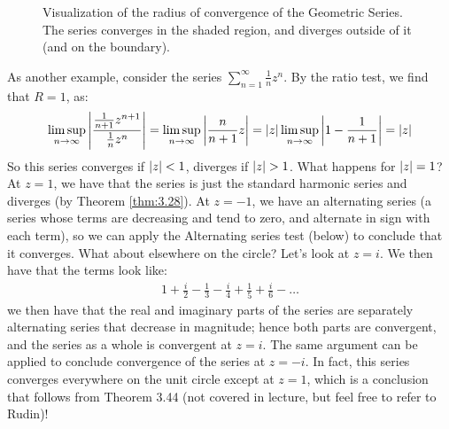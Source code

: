\begin{figure}[htbp]
    \centering
    \caption{Visualization of the radius of convergence of the Geometric Series. The series converges in the shaded region, and diverges outside of it (and on the boundary).}
    \label{fig16}
\end{figure}


As another example, consider the series $\sum_{n=1}^\infty \frac{1}{n}z^n$. By the ratio test, we find that $R = 1$, as:
\begin{align*}
    \limsup_{n\rightarrow \infty} \abs{\frac{\frac{1}{n+1}z^{n+1}}{\frac{1}{n}z^n}} = \limsup_{n\rightarrow \infty}\abs{\frac{n}{n+1}z} = \abs{z} \limsup_{n\rightarrow \infty}\abs{1 - \frac{1}{n+1}} = \abs{z}
\end{align*}
So this series converges if $\abs{z} < 1$, diverges if $\abs{z} > 1$. What happens for $\abs{z} = 1$? At $z = 1$, we have that the series is just the standard harmonic series and diverges (by Theorem \ref{thm:3.28}). At $z = -1$, we have an alternating series (a series whose terms are decreasing and tend to zero, and alternate in sign with each term), so we can apply the Alternating series test (below) to conclude that it converges. What about elsewhere on the circle? Let's look at $z = i$. We then have that the terms look like:
\begin{align*}
    1 + \frac{i}{2} - \frac{1}{3} - \frac{i}{4} + \frac{1}{5} + \frac{i}{6} - \ldots
\end{align*}
we then have that the real and imaginary parts of the series are separately alternating series that decrease in magnitude; hence both parts are convergent, and the series as a whole is convergent at $z = i$. The same argument can be applied to conclude convergence of the series at $z = -i$. In fact, this series converges everywhere on the unit circle except at $z = 1$, which is a conclusion that follows from Theorem 3.44 (not covered in lecture, but feel free to refer to Rudin)!

